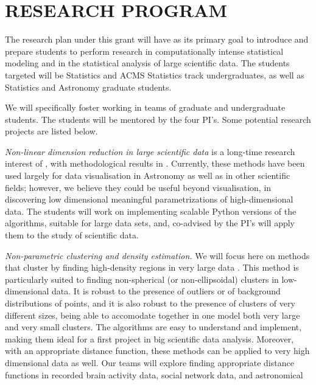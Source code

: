 \section{RESEARCH PROGRAM}
\label{sec:research}

The research plan under this grant will have as its primary goal to
introduce and prepare students to perform research in computationally
intense statistical modeling and in the statistical analysis of large
scientific data. The students targeted will be Statistics and ACMS
Statistics track undergraduates, as well as Statistics and Astronomy
graduate students. 

We will specifically foster working in teams of graduate and
undergraduate students. The students will be mentored by the four
PI's. Some potential research projects are listed below.
\bits
\item {\em Non-linear dimension reduction in large scientific data} is a long-time research interest of \meila, with methodological results in \cite{PerraultM:asymptotic-nips11,Perrault-JoncasM:riemann-jmlr11}. Currently, these methods have been used largely for data visualisation in Astronomy as well as in other scientific fields; however, we believe they could be useful beyond visualisation, in discovering low dimensional meaningful parametrizations of high-dimensional data. The students will work on implementing scalable Python versions of the algorithms, suitable for large data sets, and, co-advised by the PI's will apply them to the study of scientific data.
\item {\em Non-parametric clustering and density estimation.} We will
  focus here on methods that cluster by finding high-density regions
  in very large data \cite{cheng:95,nugent:10,rinaldo:13}. This method
  is particularly suited to finding non-spherical (or non-ellipsoidal)
  clusters in low-dimensional data. It is robust to the presence of
  outliers or of background distributions of points, and it is also
  robust to the presence of clusters of very different sizes, being
  able to accomodate together in one model both very large and very
  small clusters. The algorithms are easy to understand and implement,
  making them ideal for a first project in big scientific data
  analysis. Moreover, with an appropriate distance function, these
  methods can be applied to very high dimensional data as well. Our
  teams will explore finding appropriate distance functions in
  recorded brain activity data, social network data, and astronomical
